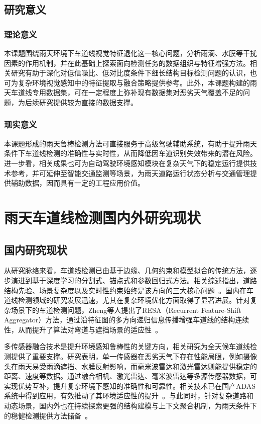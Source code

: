 \subsection{研究意义}
\subsubsection{理论意义}
本课题围绕雨天环境下车道线视觉特征退化这一核心问题，分析雨滴、水膜等干扰因素的作用机制，并在此基础上探索面向检测任务的数据组织与特征增强方法。相关研究有助于深化对低信噪比、低对比度条件下细长结构目标检测问题的认识，也可为复杂环境视觉感知中的特征提取与融合策略提供参考。此外，本课题构建的雨天车道线专用数据集，可在一定程度上弥补现有数据集对恶劣天气覆盖不足的问题，为后续研究提供较为直接的数据支撑。

\subsubsection{现实意义}
本课题形成的雨天鲁棒检测方法可直接服务于高级驾驶辅助系统，有助于提升雨天条件下车道线检测的准确性与实时性，从而降低因车道识别失效带来的潜在风险。进一步看，相关成果也可为自动驾驶环境感知模块在复杂天气下的稳定运行提供技术参考，并可延伸至智能交通监测等场景，为雨天道路运行状态分析与交通管理提供辅助数据，因而具有一定的工程应用价值。

\section{雨天车道线检测国内外研究现状}
\label{sec:related_work}
\subsection{国内研究现状}
从研究脉络来看，车道线检测已由基于边缘、几何约束和模型拟合的传统方法，逐步演进到基于深度学习的分割式、锚点式和参数回归式方法。相关综述指出，道路结构先验、场景复杂度以及实时性约束始终是该方向的三大核心问题~\cite{barhillel2014survey,cao2019lane}。国内在车道线检测领域的研究发展迅速，尤其在复杂环境优化方面取得了显著进展。针对复杂场景下的车道检测问题，Zheng等人提出了RESA（Recurrent Feature-Shift Aggregator）方法，通过沿特征图的多方向递归信息传播增强车道线的结构连续性，从而提升了算法对弯道与遮挡场景的适应性~\cite{zheng2021}。

多传感器融合技术是提升环境感知鲁棒性的关键方向，相关研究为全天候车道线检测提供了重要支撑。研究表明，单一传感器在恶劣天气下存在性能局限，例如摄像头在雨天易受雨滴遮挡、水膜反射影响，而毫米波雷达和激光雷达则能提供稳定的距离、速度等数据。通过融合相机、激光雷达、毫米波雷达等多源传感器数据，可实现优势互补，提升复杂环境下感知的准确性和可靠性。相关技术已在国产ADAS系统中得到应用，有效推动了其环境适应性的提升~\cite{zhu2024}。与此同时，针对复杂道路和动态场景，国内外也在持续探索更强的结构建模与上下文聚合机制，为雨天条件下的稳健检测提供方法储备~\cite{li2022,zheng2022clrnet,hou2019sad,qin2020ultrafast}。

